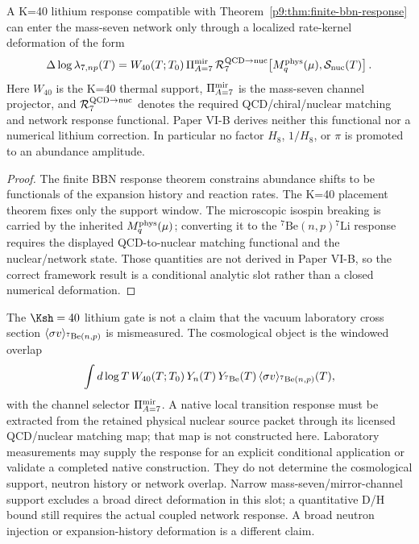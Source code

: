 \documentclass[12pt,a4paper]{article}
\begin{document}
\begin{proposition}[Lithium response as a \(\Ksh=40\) conditional mirror-channel slot]
\label{p9:prop:lithium-k40-mirror-kernel}
A K=40 lithium response compatible with
Theorem~\ref{p9:thm:finite-bbn-response} can enter the mass-seven network only
through a localized rate-kernel deformation of the form
\begin{equation}
\label{p9:eq:lithium-k40-rate-deformation}
 \Delta\log\lambda_{7,np}(T)
 =W_{40}(T;T_0)\,\Pi_{A=7}^{\rm mir}\,
   \mathcal R_{7}^{\rm QCD\to nuc}
   \!\left[M_q^{\rm phys}(\mu),\mathcal S_{\rm nuc}(T)\right].
\end{equation}
Here \(W_{40}\) is the K=40 thermal support, \(\Pi_{A=7}^{\rm mir}\) is the
mass-seven channel projector, and
\(\mathcal R_{7}^{\rm QCD\to nuc}\) denotes the required QCD/chiral/nuclear
matching and network response functional.  Paper VI-B derives neither this
functional nor a numerical lithium correction.  In particular no factor
\(H_8\), \(1/H_8\), or \(\pi\) is promoted to an abundance amplitude.
\end{proposition}

\begin{proof}
The finite BBN response theorem constrains abundance shifts to be functionals
of the expansion history and reaction rates.  The K=40 placement theorem fixes
only the support window.  The microscopic isospin breaking is carried by the inherited
\(M_q^{\rm phys}(\mu)\); converting it to the
\({}^7\mathrm{Be}(n,p){}^7\mathrm{Li}\) response requires the displayed
QCD-to-nuclear matching functional and the nuclear/network state.  Those
quantities are not derived in Paper VI-B, so the correct framework result is a
conditional analytic slot rather than a closed numerical deformation.
\end{proof}

\begin{corollary}
\label{p9:cor:lithium-lab-and-deuterium-boundary}
The \(\Ksh=40\) lithium gate is not a claim that the vacuum laboratory cross
section \(\langle\sigma v\rangle_{{}^7{\rm Be}(n,p)}\) is mismeasured.  The
cosmological object is the windowed overlap
\begin{equation}
\label{p9:eq:lithium-windowed-overlap}
  \int d\log T\,
  W_{40}(T;T_0)\,
  Y_n(T)\,
  Y_{{}^7{\rm Be}}(T)\,
  \langle\sigma v\rangle_{{}^7{\rm Be}(n,p)}(T),
\end{equation}
with the channel selector \(\Pi_{A=7}^{\rm mir}\).  A native local transition
response must be extracted from the retained physical nuclear source packet
through its licensed QCD/nuclear matching map; that map is not constructed
here.  Laboratory measurements may supply the response for an explicit
conditional application or validate a completed native construction.  They do not determine the cosmological support, neutron
history or network overlap.  Narrow mass-seven/mirror-channel support excludes
a broad direct deformation in this slot; a quantitative D/H bound still
requires the actual coupled network response.  A broad neutron injection or
expansion-history deformation is a different claim.
\end{corollary}
\end{document}
